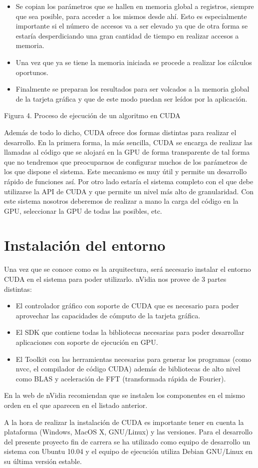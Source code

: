 \begin{itemize}
	\item Se copian los parámetros que se hallen en memoria global a registros, siempre que sea posible, para acceder a los mismos desde ahí. Esto es especialmente importante si el número de accesos va a ser elevado ya que de otra forma se estaría desperdiciando una gran cantidad de tiempo en realizar accesos a memoria.
	\item Una vez que ya se tiene la memoria iniciada se procede a realizar los cálculos oportunos.
	\item Finalmente se preparan los resultados para ser volcados a la memoria global de la tarjeta gráfica y que de este modo puedan ser leídos por la aplicación.
\end{itemize}
 
Figura 4. Proceso de ejecución de un algoritmo en CUDA

Además de todo lo dicho, CUDA ofrece dos formas distintas para realizar el desarrollo. En la primera forma, la más sencilla, CUDA se encarga de realizar las llamadas al código que se alojará en la GPU de forma transparente de tal forma que no tendremos que preocuparnos de configurar muchos de los parámetros de los que dispone el sistema. Este mecanismo es muy útil y permite un desarrollo rápido de funciones así. Por otro lado estaría el sistema completo con el que debe utilizarse la API de CUDA y que permite un nivel más alto de granularidad. Con este sistema nosotros deberemos de realizar a mano la carga del código en la GPU, seleccionar la GPU de todas las posibles, etc.

\section{Instalación del entorno}

Una vez que se conoce como es la arquitectura, será necesario instalar el entorno CUDA en el sistema para poder utilizarlo. nVidia nos provee de 3 partes distintas:

\begin{itemize}
	\item El controlador gráfico con soporte de CUDA que es necesario para poder aprovechar las capacidades de cómputo de la tarjeta gráfica.
	\item El SDK que contiene todas la bibliotecas necesarias para poder desarrollar aplicaciones con soporte de ejecución en GPU.
	\item El Toolkit con las herramientas necesarias para generar los programas (como nvcc, el compilador de código CUDA) además de bibliotecas de alto nivel como BLAS y aceleración de FFT (transformada rápida de Fourier).
\end{itemize}

En la web de nVidia recomiendan que se instalen los componentes en el mismo orden en el que aparecen en el listado anterior.

A la hora de realizar la instalación de CUDA es importante tener en cuenta la plataforma (Windows, MacOS X, GNU/Linux) y las versiones. Para el desarrollo del presente proyecto fin de carrera se ha utilizado como equipo de desarrollo un sistema con Ubuntu 10.04 y el equipo de ejecución utiliza Debian GNU/Linux en su última versión estable.
